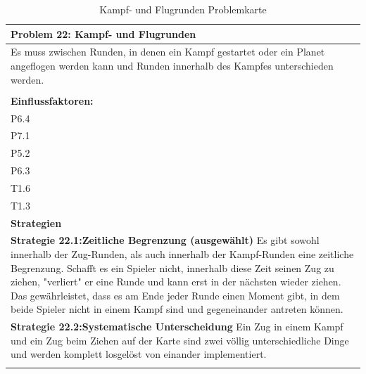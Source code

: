 \documentclass[fontsize=12pt,paper=a4,twoside]{scrartcl}
\begin{document}
\begin{table}[H]
    \centering
    \begin{tabular}{|p{15cm}|}
    \hline
          \textbf{Problem 22: Kampf- und Flugrunden}  \\ \hline
	Es muss zwischen Runden, in denen ein Kampf gestartet oder ein Planet angeflogen werden kann und Runden innerhalb des Kampfes unterschieden werden. \\
         \\ \hline
          \textbf{Einflussfaktoren: } \\
	P6.4 \\	
	P7.1 \\
	P5.2 \\
	P6.3 \\
	T1.6 \\
	T1.3 \\
          \hline
          \textbf{Strategien} \\ \hline
            {}          
           \label{strategie:22.1}     
          \textbf{Strategie 22.1:Zeitliche Begrenzung (ausgewählt)} Es gibt sowohl innerhalb der Zug-Runden, als auch innerhalb der Kampf-Runden eine zeitliche Begrenzung. Schafft es ein Spieler nicht, innerhalb diese Zeit seinen Zug zu ziehen, "verliert" er eine Runde und kann erst in der nächsten wieder ziehen. Das gewährleistet, dass es am Ende jeder Runde einen Moment gibt, in dem beide Spieler nicht in einem Kampf sind und gegeneinander antreten können.   \\        
  {}          
           \label{strategie:22.2}              
          \textbf{Strategie 22.2:Systematische Unterscheidung} Ein Zug in einem Kampf und ein Zug beim Ziehen auf der Karte sind zwei völlig unterschiedliche Dinge und werden komplett losgelöst von einander implementiert.  \\
		 \\ \hline
    \end{tabular}

    \caption{Kampf- und Flugrunden Problemkarte}
    \label{tab:ProblemKarte22}
\end{table}
\end{document}
